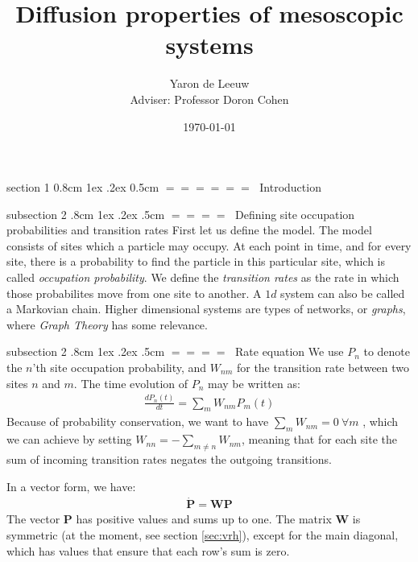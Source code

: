 \documentclass[onecolumn,fleqn,notitlepage,secnumarabic]{revtex4}
\makeatletter
\def\section{%
  \@startsection
    {section}%
    {1}%
    {\z@}%
    {0.8cm \@plus1ex \@minus .2ex}%
    {0.5cm}%
    {\Large\bf $=\!=\!=\!=\!=\!=\;$}%
}%
\def\subsection{%
  \@startsection
    {subsection}%
    {2}%
    {\z@}%
    {.8cm \@plus1ex \@minus .2ex}%
    {.5cm}%
    {\normalfont\small\bfseries$=\!=\!=\!=\;$}%
}%
\makeatother
\begin{document}
\title{Diffusion properties of mesoscopic systems}

\author{Yaron de Leeuw \\ Adviser: Professor Doron Cohen}
\date{\today}
\maketitle


\section{Introduction}

\subsection{Defining site occupation probabilities and transition rates}
First let us define the model. The model consists of sites which a particle may occupy. At each point in time, and for every site, there is a probability to find the particle in this particular site, which is called \emph{occupation probability}. We define the \emph{transition rates} as the rate in which those probabilites move from one site to another. A $1d$ system can also be called a Markovian chain. Higher dimensional systems are types of networks, or \emph{graphs}, where \emph{Graph Theory} has some relevance.

\subsection{Rate equation}
We use $P_n$ to denote the $n$'th site occupation probability, and $W_{nm}$ for the transition rate between two sites $n$ and $m$. The time evolution of $P_n$ may be written as:
\begin{align}
\frac{dP_n(t)}{dt} = \sum_m W_{nm}P_m(t)
\end{align}
Because of probability conservation, we want to have $\sum_m W_{nm} = 0 \  \forall m$ , which we can achieve by setting $W_{nn} = -\sum_{m\ne n} W_{nm} $, meaning that for each site the sum of incoming transition rates negates the outgoing transitions.

In a vector form, we have:
\begin{align} \boldsymbol{ \dot P } = \boldsymbol{W} \boldsymbol{P} \end{align}
The vector $\boldsymbol{P}$ has positive values and sums up to one. The matrix $\boldsymbol{W}$ is symmetric (at the moment, see section \ref{sec:vrh}), except for the main diagonal, which has values that ensure that each row's sum is zero.
\end{document}
